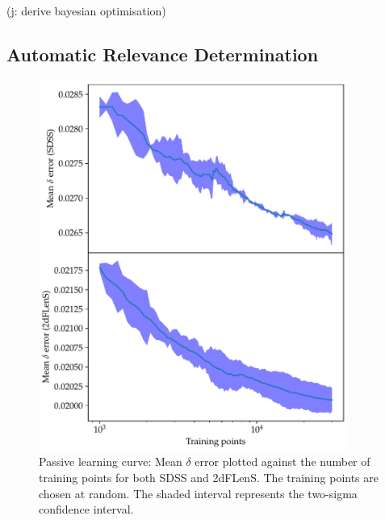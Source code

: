 \documentclass[11pt,twoside]{report}
\newcommand\jakub[1]{{\color{red}(j: #1)}}
\begin{document}
\jakub{derive bayesian optimisation}

\subsection{Automatic Relevance Determination}
  \begin{figure}
    \centering
    \includegraphics[width=0.9\textwidth]{passive_delta.pdf}
    \caption{Passive learning curve: Mean $\delta$ error plotted against the number of training points for both SDSS and 2dFLenS. The training points are chosen at random. The shaded interval represents the two-sigma confidence interval.}
    \label{fig:passive_delta}
  \end{figure}
\end{document}
